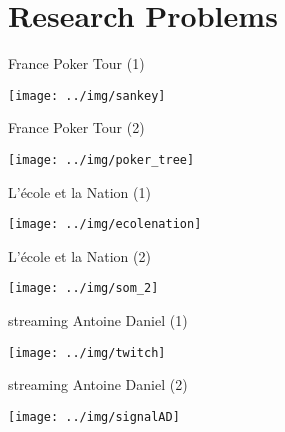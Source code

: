 \documentclass[11pt]{beamer}
\begin{document}

\section{Research Problems}

\begin{frame}{France Poker Tour (1)}
\begin{center}
\texttt{[image: ../img/sankey]}
\end{center}
\end{frame}

\begin{frame}{France Poker Tour (2)}
\begin{center}
\texttt{[image: ../img/poker\_tree]}
\end{center}
\end{frame}

\begin{frame}{L'école et la Nation (1)}
\begin{center}
\texttt{[image: ../img/ecolenation]}
\end{center}
\end{frame}

\begin{frame}{L'école et la Nation (2)}
\begin{center}
\texttt{[image: ../img/som\_2]}
\end{center}
\end{frame}

\begin{frame}{streaming Antoine Daniel (1)}
\begin{center}
\texttt{[image: ../img/twitch]}
\end{center}
\end{frame}

\begin{frame}{streaming Antoine Daniel (2)}
\begin{center}
\texttt{[image: ../img/signalAD]}
\end{center}
\end{frame}
\end{document}
